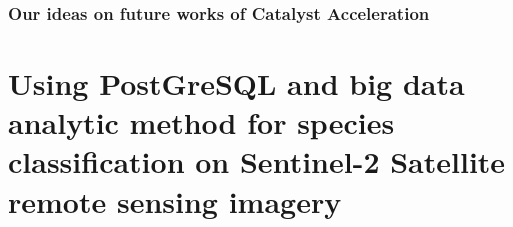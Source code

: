 \documentclass[12pt]{article}
\begin{document}
        \subsubsection{Our ideas on future works of Catalyst Acceleration}

    




\section{Using PostGreSQL and big data analytic method for species classification on Sentinel-2 Satellite remote sensing imagery}




\newpage

\appendix
\end{document}
